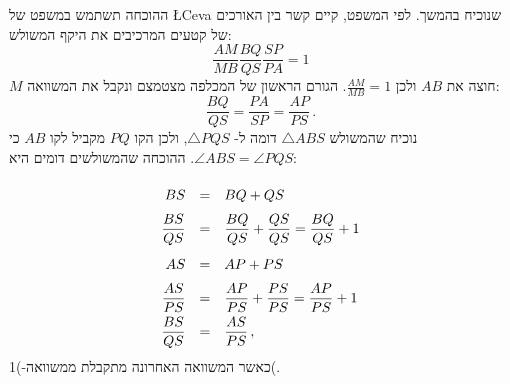ההוכחה תשתמש במשפט של
\L{Ceva}
שנוכיח בהמשך. לפי המשפט, קיים קשר בין האורכים של קטעים המרכיבים את היקף המשולש:
\[
\frac{AM}{MB}\frac{BQ}{QS}\frac{SP}{PA} = 1
\]
$M$
חוצה את
$AB$
ולכן
$\frac{AM}{MB}=1$.
הגורם הראשון של המכלפה מצטמצם ונקבל את המשוואה:
\begin{equation}
\frac{BQ}{QS}=\frac{PA}{SP}=\frac{AP}{PS}\,.
\end{equation}
נוכיח שהמשולש
$\triangle ABS$
דומה ל-%
$\triangle PQS$,
ולכן הקו
$PQ$
מקביל לקו
$AB$
כי
$\angle ABS = \angle PQS$.
ההוכחה שהמשולשים דומים היא:
\vspace*{-10pt}
\[
\renewcommand*{\arraystretch}{2}
\begin{array}{rcl}
BS&=&BQ+QS\\
\disfrac{BS}{QS}&=&\disfrac{BQ}{QS}+\disfrac{QS}{QS} = \disfrac{BQ}{QS}+1\\
AS&=&AP+PS\\
\disfrac{AS}{PS} &=& \disfrac{AP}{PS} + \disfrac{PS}{PS} = \disfrac{AP}{PS} + 1\\
\disfrac{BS}{QS}&=&\disfrac{AS}{PS}\,,
\end{array}
\]
כאשר המשוואה האחרונה מתקבלת ממשוואה-)1(.


